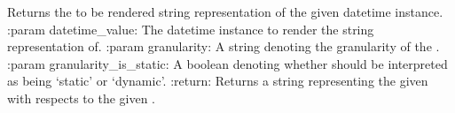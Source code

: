 \documentclass[letterpaper,10pt,english]{sphinxmanual}
\begin{document}

\begin{fulllineitems}
\label{\detokenize{pydash_web.controller.dashboard_statistic:pydash_web.controller.dashboard_statistic.datetime_to_rendered_string}}
Returns the to be rendered string representation of the given datetime instance.
:param datetime\_value: The datetime instance to render the string representation of.
:param granularity: A string denoting the granularity of the .
:param granularity\_is\_static: A boolean denoting whether  should be interpreted as being ‘static’ or ‘dynamic’.
:return: Returns a string representing the given  with respects to the given .

\end{fulllineitems}

\end{document}
